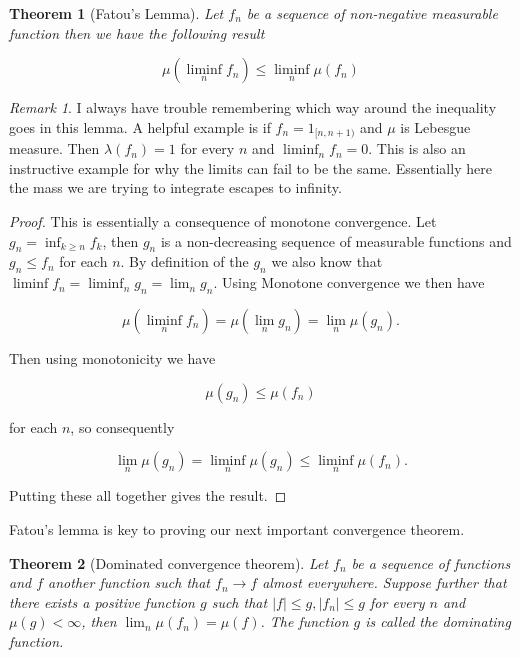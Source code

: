 \documentclass[
]{book}
\newtheorem{theorem}{Theorem}[chapter]
\theoremstyle{definition}
\theoremstyle{definition}
\theoremstyle{definition}
\theoremstyle{definition}
\theoremstyle{remark}
\newtheorem*{remark}{Remark}
\begin{document}
\begin{theorem}[Fatou's Lemma]
Let \(f_n\) be a sequence of non-negative measurable function then we have the following result

\[ \mu \left( \liminf_n f_n \right) \leq \liminf_n \mu(f_n) \]
\end{theorem}

\begin{remark}
I always have trouble remembering which way around the inequality goes in this lemma. A helpful example is if \(f_n = 1_{[n,n+1)}\) and \(\mu\) is Lebesgue measure. Then \(\lambda(f_n) = 1\) for every \(n\) and \(\liminf_n f_n = 0\). This is also an instructive example for why the limits can fail to be the same. Essentially here the mass we are trying to integrate escapes to infinity.
\end{remark}

\begin{proof}
This is essentially a consequence of monotone convergence. Let \(g_n = \inf_{k \geq n} f_k\), then \(g_n\) is a non-decreasing sequence of measurable functions and \(g_n \leq f_n\) for each \(n\). By definition of the \(g_n\) we also know that \(\liminf f_n = \liminf_n g_n = \lim_n g_n\). Using Monotone convergence we then have

\[ \mu(\liminf_n f_n) = \mu(\lim_n g_n) = \lim_n \mu(g_n). \]

Then using monotonicity we have

\[ \mu(g_n) \leq \mu(f_n) \]

for each \(n\), so consequently

\[\lim_n \mu(g_n) =  \liminf_n \mu(g_n) \leq \liminf_n \mu(f_n). \]

Putting these all together gives the result.
\end{proof}

Fatou's lemma is key to proving our next important convergence theorem.

\begin{theorem}[Dominated convergence theorem]
Let \(f_n\) be a sequence of functions and \(f\) another function such that \(f_n \rightarrow f\) almost everywhere. Suppose further that there exists a positive function \(g\) such that \(|f| \leq g, |f_n| \leq g\) for every \(n\) and \(\mu(g) < \infty\), then \(\lim_n \mu(f_n) = \mu(f)\). The function \(g\) is called the \emph{dominating function}.
\end{theorem}
\end{document}
